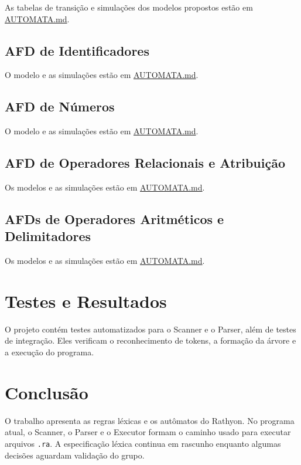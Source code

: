 \documentclass[12pt,a4paper]{article}
\begin{document}
As tabelas de transição e simulações dos modelos propostos estão em \href{../markdown/AUTOMATA.md}{AUTOMATA.md}.

\subsection{AFD de Identificadores}

O modelo e as simulações estão em \href{../markdown/AUTOMATA.md}{AUTOMATA.md}.

\subsection{AFD de Números}

O modelo e as simulações estão em \href{../markdown/AUTOMATA.md}{AUTOMATA.md}.

\subsection{AFD de Operadores Relacionais e Atribuição}

Os modelos e as simulações estão em \href{../markdown/AUTOMATA.md}{AUTOMATA.md}.

\subsection{AFDs de Operadores Aritméticos e Delimitadores}

Os modelos e as simulações estão em \href{../markdown/AUTOMATA.md}{AUTOMATA.md}.


\section{Testes e Resultados}

O projeto contém testes automatizados para o Scanner e o Parser, além de testes de integração. Eles verificam o reconhecimento de tokens, a formação da árvore e a execução do programa.


\section{Conclusão}

O trabalho apresenta as regras léxicas e os autômatos do Rathyon. No programa atual, o Scanner, o Parser e o Executor formam o caminho usado para executar arquivos \texttt{.ra}. A especificação léxica continua em rascunho enquanto algumas decisões aguardam validação do grupo.
\end{document}
